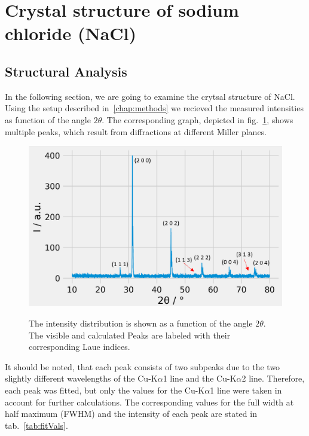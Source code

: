 
\newpage

\section{Crystal structure of sodium chloride (NaCl)}
\label{sec:NaCl}

\subsection*{Structural Analysis}


In the following section, we are going to examine the crytsal structure of NaCl. Using the setup described in~\ref{chap:methods} we recieved the measured intensities as function of the angle $2\theta$. The corresponding graph, depicted in fig.~\ref{fig:Peaks}, shows multiple peaks, which result from diffractions at different Miller planes.  

\begin{figure}[ht]
    \centering
    \includegraphics[angle = 90, width = 0.8\linewidth]{Bilder/Auswertung/NaCl/Ivs2thwIndices.png}
    \label{fig:Peaks}
    \caption{The intensity distribution is shown as a function of the angle $2\theta$. The visible and calculated Peaks are labeled with their corresponding Laue indices.}
\end{figure}

It should be noted, that each peak consists of two subpeaks due to the two slightly different wavelengths of the Cu-K$\alpha$1 line and the Cu-K$\alpha$2 line. Therefore, each peak was fitted, but only the values for the Cu-K$\alpha$1 line were taken in account for further calculations. The corresponding values for the full width at half maximum (FWHM) and the intensity of each peak are stated in tab.~\ref{tab:fitVals}.


